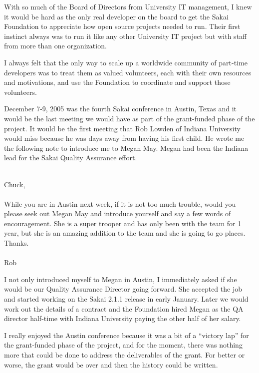 \documentclass[12pt]{book}
\begin{document}
With so much of the Board of Directors from University IT
management, I knew it would be hard as the only real developer
on the board to get the Sakai Foundation to appreciate
how open source projects needed to run.  Their first instinct
always was to run it like any other University IT project
but with staff from more than one organization.

I always felt that the only way to scale up a worldwide community
of part-time developers was to treat them as valued volunteers,
each with their own resources and motivations, and use the
Foundation to coordinate and support those volunteers.

December 7-9, 2005 was the fourth Sakai conference in Austin, Texas and it would
be the last meeting we would have as part of the grant-funded
phase of the project.  It would be the first meeting that Rob
Lowden of Indiana University would miss because he was days
away from having his first child.  He wrote me the following
note to introduce me to Megan May.  Megan had been the Indiana
lead for the Sakai Quality Assurance effort.\\
\\
\begin{sf}
Chuck,\\
\\
While you are in Austin next week, if it is not
too much trouble, would you please seek out Megan
May and introduce yourself and say a few words of
encouragement.  She is a super trooper and has only
been with the team for 1 year, but she is an amazing
addition to the team and she is going to go places.
Thanks.\\
\\
Rob\\
\end{sf}

I not only introduced myself to Megan in Austin, I immediately
asked if she would be our Quality Assurance Director going forward.
She accepted the job and started working on the Sakai 2.1.1
release in early January.   Later we would work out the
details of a contract and the Foundation
hired Megan as the QA director half-time with Indiana University
paying the other half of her salary.

I really enjoyed the Austin conference because it was a
bit of a ``victory lap'' for the grant-funded phase of the
project, and for the moment, there was nothing more that
could be done to address the deliverables of the grant.
For better or worse, the grant would be over and then
the history could be written.
\end{document}
